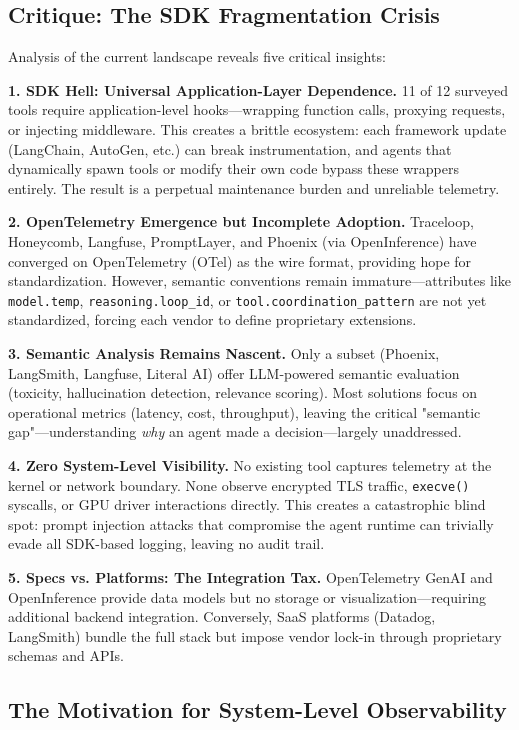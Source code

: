 \documentclass[sigplan,screen，review,9pt]{acmart}
\begin{document}
\subsection{Critique: The SDK Fragmentation Crisis}

Analysis of the current landscape reveals five critical insights:

\textbf{1. SDK Hell: Universal Application-Layer Dependence.} 11 of 12 surveyed tools require application-level hooks—wrapping function calls, proxying requests, or injecting middleware. This creates a brittle ecosystem: each framework update (LangChain, AutoGen, etc.) can break instrumentation, and agents that dynamically spawn tools or modify their own code bypass these wrappers entirely. The result is a perpetual maintenance burden and unreliable telemetry.

\textbf{2. OpenTelemetry Emergence but Incomplete Adoption.} Traceloop, Honeycomb, Langfuse, PromptLayer, and Phoenix (via OpenInference) have converged on OpenTelemetry (OTel) as the wire format, providing hope for standardization. However, semantic conventions remain immature—attributes like \texttt{model.temp}, \texttt{reasoning.loop\_id}, or \texttt{tool.coordination\_pattern} are not yet standardized, forcing each vendor to define proprietary extensions.

\textbf{3. Semantic Analysis Remains Nascent.} Only a subset (Phoenix, LangSmith, Langfuse, Literal AI) offer LLM-powered semantic evaluation (toxicity, hallucination detection, relevance scoring). Most solutions focus on operational metrics (latency, cost, throughput), leaving the critical "semantic gap"—understanding \emph{why} an agent made a decision—largely unaddressed.

\textbf{4. Zero System-Level Visibility.} No existing tool captures telemetry at the kernel or network boundary. None observe encrypted TLS traffic, \texttt{execve()} syscalls, or GPU driver interactions directly. This creates a catastrophic blind spot: prompt injection attacks that compromise the agent runtime can trivially evade all SDK-based logging, leaving no audit trail.

\textbf{5. Specs vs. Platforms: The Integration Tax.} OpenTelemetry GenAI and OpenInference provide data models but no storage or visualization—requiring additional backend integration. Conversely, SaaS platforms (Datadog, LangSmith) bundle the full stack but impose vendor lock-in through proprietary schemas and APIs.

\subsection{The Motivation for System-Level Observability}
\end{document}
